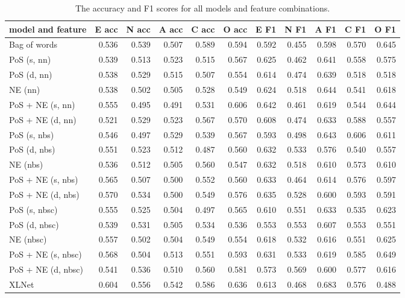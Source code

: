 \documentclass[10pt, a4paper]{article}
\begin{document}
\begin{table}
  \begin{center}
  \begin{tabular}{lrrrrrrrrrr}
    \toprule
    model and feature  &  E acc &  N acc &  A acc &  C acc &  O acc &   E F1 &   N F1 &   A F1 &   C F1 &   O F1\\
    \midrule
          Bag of words &  0.536 &  0.539 &  0.507 &  0.589 &  0.594 &  0.592 &  0.455 &  0.598 &  0.570 &  0.645\\
           PoS (s, nn) &  0.539 &  0.513 &  0.523 &  0.515 &  0.567 &  0.625 &  0.462 &  0.641 &  0.558 &  0.575\\
           PoS (d, nn) &  0.538 &  0.529 &  0.515 &  0.507 &  0.554 &  0.614 &  0.474 &  0.639 &  0.518 &  0.518\\
               NE (nn) &  0.538 &  0.502 &  0.505 &  0.528 &  0.549 &  0.624 &  0.518 &  0.644 &  0.541 &  0.618\\
      PoS + NE (s, nn) &  0.555 &  0.495 &  0.491 &  0.531 &  0.606 &  0.642 &  0.461 &  0.619 &  0.544 &  0.644\\
      PoS + NE (d, nn) &  0.521 &  0.529 &  0.523 &  0.567 &  0.570 &  0.608 &  0.474 &  0.633 &  0.588 &  0.557\\
          PoS (s, nbs) &  0.546 &  0.497 &  0.529 &  0.539 &  0.567 &  0.593 &  0.498 &  0.643 &  0.606 &  0.611\\
          PoS (d, nbs) &  0.551 &  0.523 &  0.512 &  0.487 &  0.560 &  0.632 &  0.533 &  0.576 &  0.540 &  0.557\\
              NE (nbs) &  0.536 &  0.512 &  0.505 &  0.560 &  0.547 &  0.632 &  0.518 &  0.610 &  0.573 &  0.610\\
     PoS + NE (s, nbs) &  0.565 &  0.507 &  0.500 &  0.552 &  0.560 &  0.633 &  0.464 &  0.614 &  0.576 &  0.597\\
     PoS + NE (d, nbs) &  0.570 &  0.534 &  0.500 &  0.549 &  0.576 &  0.635 &  0.528 &  0.600 &  0.593 &  0.591\\
         PoS (s, nbsc) &  0.555 &  0.525 &  0.504 &  0.497 &  0.565 &  0.610 &  0.551 &  0.633 &  0.535 &  0.623\\
         PoS (d, nbsc) &  0.539 &  0.531 &  0.505 &  0.534 &  0.536 &  0.553 &  0.553 &  0.607 &  0.553 &  0.551\\
             NE (nbsc) &  0.557 &  0.502 &  0.504 &  0.549 &  0.554 &  0.618 &  0.532 &  0.616 &  0.551 &  0.625\\
    PoS + NE (s, nbsc) &  0.568 &  0.504 &  0.513 &  0.551 &  0.593 &  0.631 &  0.533 &  0.619 &  0.585 &  0.649\\
    PoS + NE (d, nbsc) &  0.541 &  0.536 &  0.510 &  0.560 &  0.581 &  0.573 &  0.569 &  0.600 &  0.577 &  0.616\\
                 XLNet &  0.604 &  0.556 &  0.542 &  0.586 &  0.636 &  0.613 &  0.468 &  0.683 &  0.576 &  0.488\\
    \bottomrule
  \end{tabular}
  \end{center}
  \caption{The accuracy and F1 scores for all models and feature combinations.}
  \label{table:acc-f1}
\end{table}
\end{document}
